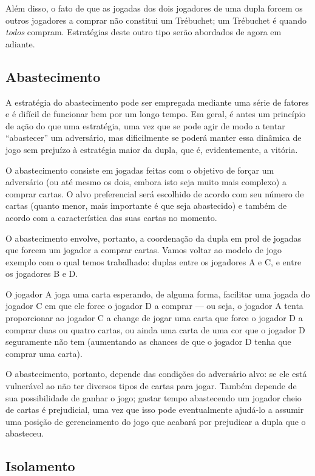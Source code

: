 Além disso, o fato de que as jogadas dos dois jogadores de uma dupla forcem os outros jogadores a comprar não constitui um Trébuchet; um Trébuchet é quando \emph{todos} compram. Estratégias deste outro tipo serão abordados de agora em adiante.

\subsection{Abastecimento}

A estratégia do abastecimento pode ser empregada mediante uma série de fatores e é difícil de funcionar bem por um longo tempo. Em geral, é antes um princípio de ação do que uma estratégia, uma vez que se pode agir de modo a tentar ``abastecer'' um adversário, mas dificilmente se poderá manter essa dinâmica de jogo sem prejuízo à estratégia maior da dupla, que é, evidentemente, a vitória.

O abastecimento consiste em jogadas feitas com o objetivo de forçar um adversário (ou até mesmo os dois, embora isto seja muito mais complexo) a comprar cartas. O alvo preferencial será escolhido de acordo com seu número de cartas (quanto menor, mais importante é que seja abastecido) e também de acordo com a característica das suas cartas no momento.

O abastecimento envolve, portanto, a coordenação da dupla em prol de jogadas que forcem um jogador a comprar cartas. Vamos voltar ao modelo de jogo exemplo com o qual temos trabalhado: duplas entre os jogadores A e C, e entre os jogadores B e D.

O jogador A joga uma carta esperando, de alguma forma, facilitar uma jogada do jogador C em que ele force o jogador D a comprar --- ou seja, o jogador A tenta proporcionar ao jogador C a change de jogar uma carta que force o jogador D a comprar duas ou quatro cartas, ou ainda uma carta de uma cor que o jogador D seguramente não tem (aumentando as chances de que o jogador D tenha que comprar uma carta).

O abastecimento, portanto, depende das condições do adversário alvo: se ele está vulnerável ao não ter diversos tipos de cartas para jogar. Também depende de sua possibilidade de ganhar o jogo; gastar tempo abastecendo um jogador cheio de cartas é prejudicial, uma vez que isso pode eventualmente ajudá-lo a assumir uma posição de gerenciamento do jogo que acabará por prejudicar a dupla que o abasteceu.

\subsection{Isolamento}

